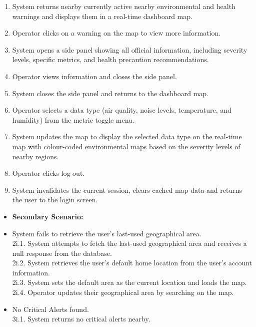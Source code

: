 \documentclass[]{article}
\begin{document}
\begin{enumerate}[{\bf BE1.}]
\begin{enumerate}[{\bf VP1.}]
\begin{enumerate}[1.]
				\item System returns nearby currently active nearby environmental and health warnings and displays them in a real-time dashboard map.
				\item Operator clicks on a warning on the map to view more information.
				\item System opens a side panel showing all official information, including severity levels, specific metrics, and health precaution recommendations.
				\item Operator views information and closes the side panel.
				\item System closes the side panel and returns to the dashboard map.
				\item Operator selects a data type (air quality, noise levels, temperature, and humidity) from the metric toggle menu.
				\item System updates the map to display the selected data type on the real-time map with colour-coded environmental maps based on the severity levels of nearby regions.
				\item Operator clicks log out.
				\item System invalidates the current session, clears cached map data and returns the user to the login screen.
			\end{enumerate}
			\begin{itemize}
				\item[] {\bf Secondary Scenario:}
				\item[2i.] System fails to retrieve the user's last-used geographical area. \\
				\hspace{1cm}2i.1. System attempts to fetch the last-used geographical area and receives a null response from the database. \\
				\hspace{1cm}2i.2. System retrieves the user's default home location from the user's account information. \\
				\hspace{1cm}2i.3. System sets the default area as the current location and loads the map. \\
				\hspace{1cm}2i.4. Operator updates their geographical area by searching on the map.
				\item[3i.] No Critical Alerts found. \\
				\hspace{1cm}3i.1. System returns no critical alerts nearby. \\

\end{itemize}
\end{enumerate}
\end{enumerate}
\end{document}

